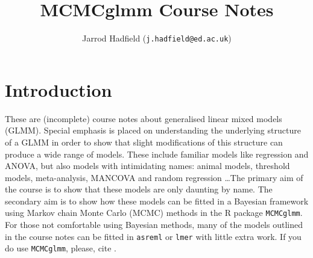 \documentclass[oneside]{book}
\title{
\Large MCMCglmm Course Notes
}
\author{
\Large Jarrod Hadfield (\texttt{j.hadfield@ed.ac.uk})
}
\begin{document}
\maketitle


\chapter*{Introduction}

These are (incomplete) course notes about generalised linear mixed models (GLMM). Special emphasis is placed on understanding the underlying structure of a GLMM in order to show that slight modifications of this structure can produce a wide range of models.  These include familiar models like regression and ANOVA, but also models with intimidating names: animal models, threshold models, meta-analysis, MANCOVA and random regression \dots The primary aim of the course is to show that these models are only daunting by name. The secondary aim is to show how these models can be fitted in a Bayesian framework using Markov chain Monte Carlo (MCMC) methods in the R package \texttt{MCMCglmm}. For those not comfortable using Bayesian methods, many of the models outlined in the course notes can be fitted in \texttt{asreml} or \texttt{lmer} with little extra work. If you do use \texttt{MCMCglmm}, please, cite \citet{Hadfield.2010c}.\\

\tableofcontents


\end{document}
